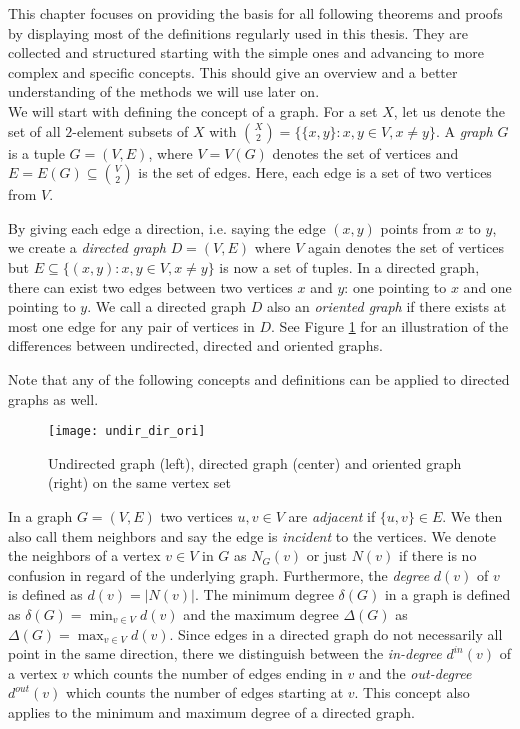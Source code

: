 This chapter focuses on providing the basis for all following theorems and proofs by displaying most of the definitions regularly used in this thesis. They are collected and structured starting with the simple ones and advancing to more complex and specific concepts. This should give an overview and a better understanding of the methods we will use later on.\\

We will start with defining the concept of a graph. For a set $X$, let us denote the set of all $2$-element subsets of $X$ with ${X\choose 2} =\lbrace \lbrace x,y\rbrace : x,y\in V, x\neq y\rbrace$. A \textit{graph} $G$ is a tuple $G=(V,E)$, where $V=V(G)$ denotes the set of vertices and $E=E(G)\subseteq {V\choose 2}$ is the set of edges. Here, each edge is a set of two vertices from $V$.

By giving each edge a direction, i.e. saying the edge $(x,y)$ points from $x$ to $y$, we create a \textit{directed graph} $D=(V,E)$ where $V$ again denotes the set of vertices but $E\subseteq \lbrace (x,y) : x,y\in V, x\neq y\rbrace$ is now a set of tuples. In a directed graph, there can exist two edges between two vertices $x$ and $y$: one pointing to $x$ and one pointing to $y$. We call a directed graph $D$ also an \textit{oriented graph} if there exists at most one edge for any pair of vertices in $D$. See Figure \ref{f1ba} for an illustration of the differences between undirected, directed and oriented graphs. 

Note that any of the following concepts and definitions can be applied to directed graphs as well.

\begin{figure}[ht]
\begin{center}
\texttt{[image: undir\_dir\_ori]}
\end{center}
\caption{Undirected graph (left), directed graph (center) and oriented graph (right) on the same vertex set}
\label{f1ba}
\end{figure}

In a graph $G=(V,E)$ two vertices $u,v\in V$ are \textit{adjacent} if $\{u,v\}\in E$. We then also call them neighbors and say the edge is \textit{incident} to the vertices. We denote the neighbors of a vertex $v\in V$ in $G$ as $N_G(v)$ or just $N(v)$ if there is no confusion in regard of the underlying graph. Furthermore, the \textit{degree} $d(v)$ of $v$ is defined as $d(v) =\vert N(v)\vert$. The minimum degree $\delta (G)$ in a graph is defined as $\displaystyle\delta (G)=\min_{v\in V}d(v)$ and the maximum degree $\Delta (G)$ as $\displaystyle\Delta (G)=\max_{v\in V}d(v)$. Since edges in a directed graph do not necessarily all point in the same direction, there we distinguish between the \textit{in-degree} $d^{in}(v)$ of a vertex $v$ which counts the number of edges ending in $v$ and the \textit{out-degree} $d^{out}(v)$ which counts the number of edges starting at $v$. This concept also applies to the minimum and maximum degree of a directed graph.\\

